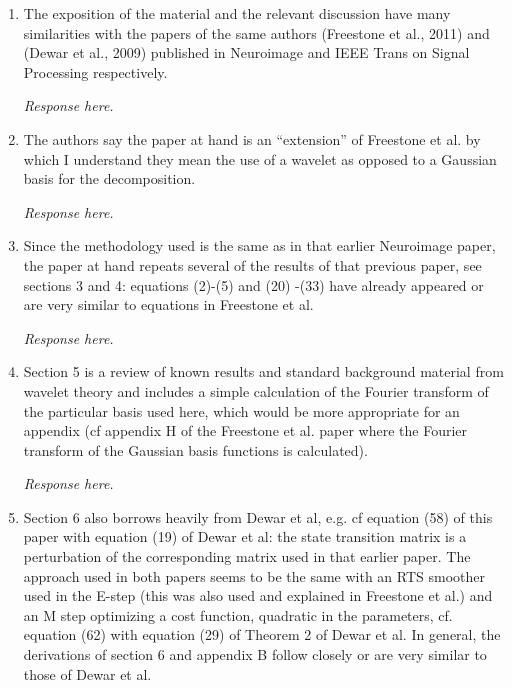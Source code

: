 \documentclass{article}
\begin{document}
    \begin{enumerate}
        \item The exposition of the material and the relevant discussion have many similarities with the papers of the same authors (Freestone et al., 2011) and (Dewar et al., 2009) published in Neuroimage and IEEE Trans on Signal Processing  respectively.

	\emph{Response here.}
	
        \item The authors say the paper at hand is an ``extension'' of Freestone et al. by which I understand they mean the use of a wavelet as opposed to a Gaussian basis for the decomposition.

	\emph{Response here.}

        \item Since the methodology used is the same as in that earlier Neuroimage paper, the paper at hand repeats several of  the results of that previous paper, see sections 3 and 4: equations (2)-(5) and (20) -(33) have already appeared or are very similar to equations in Freestone et al.

	\emph{Response here.}
	        
        \item Section 5 is a review of known results and standard background material from wavelet theory and includes a simple calculation of the Fourier transform of the particular basis used here, which would be more appropriate for an appendix (cf appendix H of the Freestone et al. paper where the Fourier transform of the Gaussian basis functions is calculated).

		\emph{Response here.}

        \item Section 6 also borrows heavily from Dewar et al, e.g. cf equation (58) of this paper with equation (19) of Dewar et al: the state transition matrix is a perturbation of the corresponding matrix used in that earlier paper. The approach used in both papers seems to be the same with an RTS smoother used in the E-step (this was also used and explained in Freestone et al.) and an M step optimizing a cost function, quadratic in the parameters, cf. equation (62) with  equation (29) of Theorem 2 of Dewar et al. In general, the derivations of section 6 and appendix B follow closely or are very similar to those of Dewar et al.


\end{enumerate}
\end{document}
